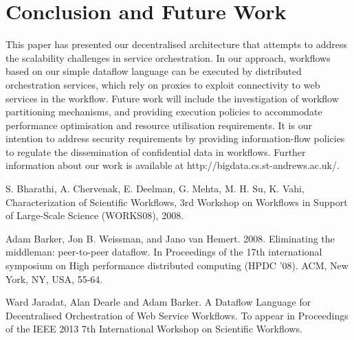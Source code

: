 \documentclass[10pt, conference, compsocconf]{IEEEtran}
\begin{document}
\section{Conclusion and Future Work}

This paper has presented our decentralised architecture that attempts to address the scalability challenges in service orchestration. In our approach, workflows based on our simple dataflow language can be executed by distributed orchestration services, which rely on proxies to exploit connectivity to web services in the workflow. Future work will include the investigation of workflow partitioning mechanisms, and providing execution policies to accommodate performance optimisation and resource utilisation requirements. It is our intention to address security requirements by providing information-flow policies to regulate the dissemination of confidential data in workflows. Further information about our work is available at http://bigdata.cs.st-andrews.ac.uk/.

























\begin{thebibliography}{1}

\bibitem{} S. Bharathi, A. Chervenak, E. Deelman, G. Mehta, M. H. Su, K. Vahi, Characterization of Scientific Workflows, 3rd Workshop on Workflows in Support of Large-Scale Science (WORKS08), 2008.

\bibitem{} Adam Barker, Jon B. Weissman, and Jano van Hemert. 2008. Eliminating the middleman: peer-to-peer dataflow. In Proceedings of the 17th international symposium on High performance distributed computing (HPDC '08). ACM, New York, NY, USA, 55-64.

\bibitem{} Ward Jaradat, Alan Dearle and Adam Barker. A Dataflow Language for Decentralised Orchestration of Web Service Workflows. To appear in Proceedings of the IEEE 2013 7th International Workshop on Scientific Workflows.

\end{thebibliography}
\end{document}

